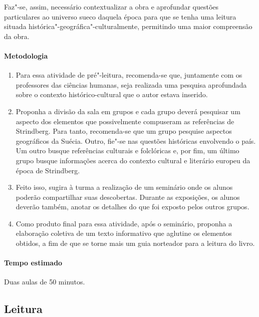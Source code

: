 \documentclass[12pt]{extarticle}
\begin{document}
Faz"-se, assim, necessário contextualizar a obra e aprofundar questões particulares ao universo 
sueco daquela época para que se tenha uma leitura situada histórica"-geográfica"-culturalmente, 
permitindo uma maior compreensão da obra. 

\paragraph{Metodologia}

\begin{enumerate}

\item
Para essa atividade de pré"-leitura, recomenda-se que, juntamente com os professores das 
ciências humanas, seja realizada uma pesquisa aprofundada sobre o contexto histórico-cultural
que o autor estava inserido. 

\item
Proponha a divisão da sala em grupos e cada grupo deverá pesquisar um aspecto dos elementos 
que possivelmente compuseram as referências de Strindberg. Para tanto,
recomenda-se que um grupo pesquise aspectos geográficos da Suécia.
Outro, fie"-se nas questões históricas envolvendo o país. Um outro busque
referências culturais e folclóricas e, por fim, um último grupo busque
informações acerca do contexto cultural e literário europeu da época de
Strindberg. 

\item
Feito isso, sugira à turma a realização de um seminário onde os
alunos poderão compartilhar suas descobertas. Durante as exposições, os alunos
deverão também, anotar os detalhes do que foi exposto pelos outros grupos.

\item
Como produto final para essa atividade, após o seminário, proponha 
a elaboração coletiva de um texto informativo que aglutine os elementos obtidos, a fim de que 
se torne mais um guia norteador para a leitura do livro.

\end{enumerate}

\paragraph{Tempo estimado} Duas aulas de 50 minutos.


\subsection{Leitura}
\end{document}
